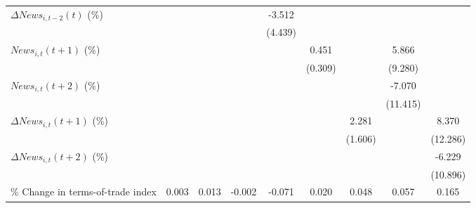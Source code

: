 {\begin{tabular}{l*{8}{c}}
\addlinespace
$ \Delta News_{i,t-2}(t)$ (\%)&                     &                     &                     &      -3.512         &                     &                     &                     &                     \\
                    &                     &                     &                     &     (4.439)         &                     &                     &                     &                     \\
\addlinespace
$ News_{i,t}(t+1)$ (\%)&                     &                     &                     &                     &       0.451         &                     &       5.866         &                     \\
                    &                     &                     &                     &                     &     (0.309)         &                     &     (9.280)         &                     \\
\addlinespace
$ News_{i,t}(t+2)$ (\%)&                     &                     &                     &                     &                     &                     &      -7.070         &                     \\
                    &                     &                     &                     &                     &                     &                     &    (11.415)         &                     \\
\addlinespace
$ \Delta News_{i,t}(t+1)$ (\%)&                     &                     &                     &                     &                     &       2.281         &                     &       8.370         \\
                    &                     &                     &                     &                     &                     &     (1.606)         &                     &    (12.286)         \\
\addlinespace
$ \Delta News_{i,t}(t+2)$ (\%)&                     &                     &                     &                     &                     &                     &                     &      -6.229         \\
                    &                     &                     &                     &                     &                     &                     &                     &    (10.896)         \\
\addlinespace
\% Change in terms-of-trade index&       0.003         &       0.013         &      -0.002         &      -0.071         &       0.020         &       0.048         &       0.057         &       0.165         \\

\end{tabular}}
